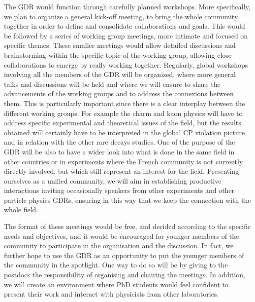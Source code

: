 The GDR would function through carefully planned workshops. More specifically, we plan to organize a general kick-off meeting, to bring the whole community together in order to define and consolidate collaborations and goals.  
This would be followed by a series of working group meetings, more intimate and focused on specific themes. These smaller meetings would allow detailed discussions and brainstorming within the specific topic of the working group, allowing close collaborations to emerge by really working together. Regularly, global workshops involving all the members of the GDR will be organized, where more general talks and discussions will be held and where we will ensure to share the advancements of the working groups and to address the connexions between them. This is particularly important since there is a clear interplay  between the different working groups. For example the charm and kaon physics will have to address specific experimental and theoretical issues of the field, but the results obtained will certainly have to be interpreted in the global CP violation picture and in relation with the other rare decays studies.  One of the purpose of the GDR will be also to have a wider look into what is done in the same field in other countries or in experiments where the French community is not currently directly involved, but which still represent an interest for the field. Presenting ourselves as a unified community, we will aim in establishing productive interactions inviting occasionally speakers from other experiments and other particle physics GDRs, ensuring in this way that we keep the connection with the whole field.

The format of these meetings would be free, and decided according to the specific needs and objectives, and it would be encouraged for younger members of the community to participate in the organisation and the discussion.
In fact, we further hope to use the GDR as an opportunity to put the younger members of the community in the spotlight. One way to do so will be  by giving to the postdocs the responsibility of organising and chairing the meetings. In addition, we will create an environment where PhD students would feel confident to present their work and interact with physicists from other laboratories.










